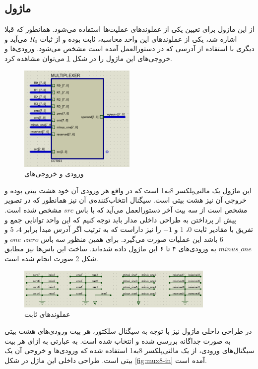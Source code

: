 \documentclass[12pt,onecolumn,a4paper,fleqn]{article}
\begin{document}
	\subsection{ماژول }
	از این ماژول برای تعیین یکی از عملوند‌های عملیت‌ها استفاده می‌شود. همانطور که قبلا اشاره شد، یکی از عملوند‌های این واحد محاسبه، ثابت بوده و از ثبات $R_0$ می‌آید و دیگری با استفاده از آدرسی که در دستورالعمل آمده است مشخص می‌شود. ورودی‌ها و خروجی‌های این ماژول را در شکل \ref{fig:multiplexer} می‌توان مشاهده کرد.
	\begin{figure}[H]
		\centering
		\includegraphics[width=0.5\textwidth]{source/multiplexer.png}
		\caption{ورودی و خروجی‌های }
		\label{fig:multiplexer}
	\end{figure}
	این ماژول یک مالتی‌پلکسر 8به1 است که در واقع هر ورودی آن خود هشت بیتی بوده و خروجی آن نیز هشت بیتی است. سیگنال انتخاب‌کننده‌ی آن نیز همانطور که در تصویر مشخص است از سه بیت آخر دستورالعمل می‌آید که با باس $src$ مشخص شده است. پیش از پرداختن به طراحی داخلی مدار باید توجه کنیم که این واحد توانایی جمع و تفریق با مقادیر ثابت $0$، $1$ و $-1$ را نیز داراست که به ترتیب اگر آدرس مبدا برابر $4$، $5$ و $6$ باشد این عملیات صورت می‌گیرد. برای همین منظور سه باس $zero$،
	$one$
	و
	$minus\_one$
	به ورودی‌های ۴ تا ۶ این ماژول داده شده‌اند. ساخت این باس‌ها نیز مطابق شکل \ref{fig:const-opr} صورت انجام شده است.
	\begin{figure}[H]
		\centering
		\includegraphics[width=0.85\textwidth]{source/const-operand.png}
		\caption{عملوند‌های ثابت}
		\label{fig:const-opr}
	\end{figure}
	در طراحی داخلی ماژول نیز با توجه به سیگنال‌ سلکتور، هر بیت ورودی‌های هشت بیتی به صورت جداگانه بررسی شده و انتخاب شده است. به عبارتی به ازای هر بیت سیگنال‌های ورودی، از یک مالتی‌پلکسر 8به1 استفاده شده که ورودی‌ها و خروجی آن یک بیتی است. طراحی داخلی این ماژل در شکل \ref{fig:mux8-in} آمده است.
\end{document}
